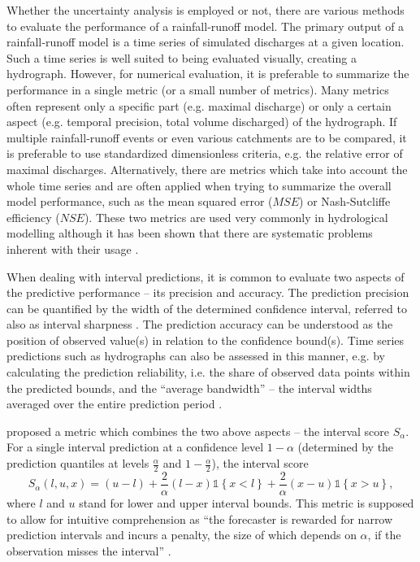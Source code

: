 \documentclass{ctuthesis}\usepackage[]{graphicx}\usepackage[]{color}
\begin{document}
Whether the uncertainty analysis is employed or not, there are various methods to evaluate the
performance of a rainfall‐runoff model. The primary output of a rainfall‐runoff model is a time series of simulated discharges at a given location. Such a time series is well suited to being evaluated visually, creating a hydrograph. However, for numerical evaluation, it is preferable to summarize the performance in a single metric (or a small number of metrics). Many metrics often represent only a specific part (e.g. maximal discharge) or only a certain aspect (e.g. temporal precision, total volume discharged) of the hydrograph. If multiple rainfall‐runoff events or even various catchments are to be compared, it is preferable to use standardized dimensionless criteria, e.g. the relative error of maximal discharges. Alternatively, there are metrics which take into account the whole time series and are often applied when trying to summarize the overall model performance, such as the mean squared error ($M\!S\!E$) or Nash‐Sutcliffe efficiency ($N\!S\!E$). These two metrics are used very commonly in hydrological modelling although it has been shown that there are systematic problems inherent with their usage \citep{guptaDecompositionMeanSquared2009}.

When dealing with interval predictions, it is common to evaluate two aspects of the predictive performance -- its precision and accuracy. The prediction precision can be quantified by the width of the determined confidence interval, referred to also as interval sharpness \mbox{\citep[e.g.][]{breinholt2012formal}}. The prediction accuracy can be understood as the position of observed value(s) in relation to the confidence bound(s). Time series predictions such as hydrographs can also  be assessed in this manner, e.g. by calculating the prediction reliability, i.e. the share of observed data points within the predicted bounds, and the \enquote{average bandwidth} --  the interval widths averaged over the entire prediction period \citep{giudice2013improving}.

\cite{gneiting2007strictly} proposed a metric which combines the two above aspects  -- the interval score $S_\alpha$. For a single interval prediction at a confidence level $1-\alpha$ (determined by the prediction quantiles at levels $ \frac{\alpha}{2} $ and $ 1-\frac{\alpha}{2} $), the interval score 
\begin{equation}
S_\alpha(l,u,x) =  ( u - l ) + \frac{2}{\alpha} (l - x)  \mathds{1} \left\{x < l \right\} + \frac{2}{\alpha} (x - u)  \mathds{1} \left\{x > u \right\} ,
\end{equation}
where $l$ and $u$ stand for lower and upper interval bounds. This metric is supposed to allow for intuitive comprehension as \enquote{the forecaster is rewarded for narrow prediction intervals and incurs a penalty, the size of which depends on $\alpha$, if the observation misses the interval} \citep{gneiting2007strictly}.
\end{document}
